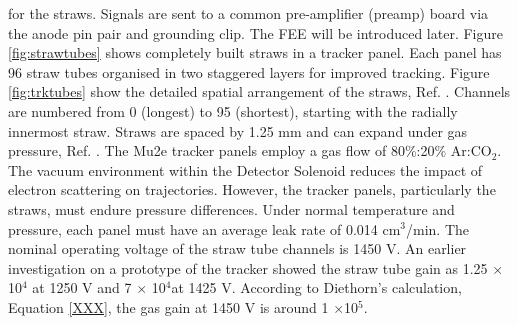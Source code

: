 for the straws. 
Signals are sent to a common pre-amplifier (preamp) board via the anode pin pair and grounding clip. 
The FEE will be introduced later. Figure \ref{fig:strawtubes} shows completely built straws in a tracker panel. 
Each panel has 96 straw tubes organised in two staggered layers for improved tracking. Figure \ref{fig:trktubes} 
show the detailed spatial arrangement of the straws, Ref. \cite{trk}. Channels are numbered from 0 (longest) 
to 95 (shortest), starting with the radially innermost straw.
Straws are spaced by 1.25 mm and can expand under gas pressure, Ref. \cite{bartoszek2015mu2e}.
The Mu2e tracker panels employ a gas flow of 80\%:20\% Ar:CO$_2$. 
The vacuum environment within the Detector Solenoid reduces the impact of electron scattering on trajectories. 
However, the tracker panels, particularly the straws, must endure pressure differences. Under normal temperature 
and pressure, each panel must have an average leak rate of 0.014 cm$^3$/min. The nominal operating voltage of 
the straw tube channels is 1450 V. An earlier investigation on a prototype of the tracker showed the straw tube 
gain as 1.25 $\times$10$^4$ at 1250 V and 7 $\times$ 10$^4$at 1425 V. According to Diethorn's calculation, Equation \ref{XXX}, 
the gas gain at 1450 V is around 1 $\times$10$^5$.

